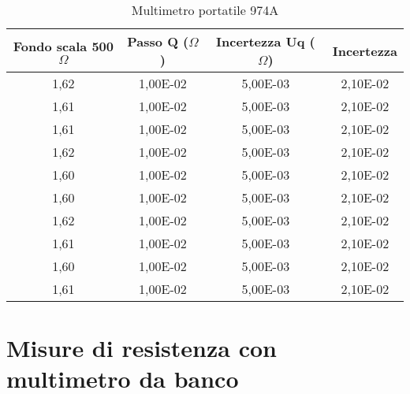 \begin{table}[h]
\centering
\begin{tabular}{|c|c|c|c|}
\hline
\rowcolor[HTML]{6FA8DC} 
Fondo scala 500$\Omega$ & Passo Q ($\Omega$) & Incertezza Uq ($\Omega$) & Incertezza \\ \hline
1,62             & 1,00E-02    & 5,00E-03          & 2,10E-02   \\ \hline
1,61             & 1,00E-02    & 5,00E-03          & 2,10E-02   \\ \hline
1,61             & 1,00E-02    & 5,00E-03          & 2,10E-02   \\ \hline
1,62             & 1,00E-02    & 5,00E-03          & 2,10E-02   \\ \hline
1,60             & 1,00E-02    & 5,00E-03          & 2,10E-02   \\ \hline
1,60             & 1,00E-02    & 5,00E-03          & 2,10E-02   \\ \hline
1,62             & 1,00E-02    & 5,00E-03          & 2,10E-02   \\ \hline
1,61             & 1,00E-02    & 5,00E-03          & 2,10E-02   \\ \hline
1,60             & 1,00E-02    & 5,00E-03          & 2,10E-02   \\ \hline
1,61             & 1,00E-02    & 5,00E-03          & 2,10E-02   \\ \hline
\end{tabular}
\caption{Multimetro portatile 974A}
\label{tab:mult_port}
\end{table}




\section{Misure di resistenza con multimetro da banco}
\label{sec:mult}

